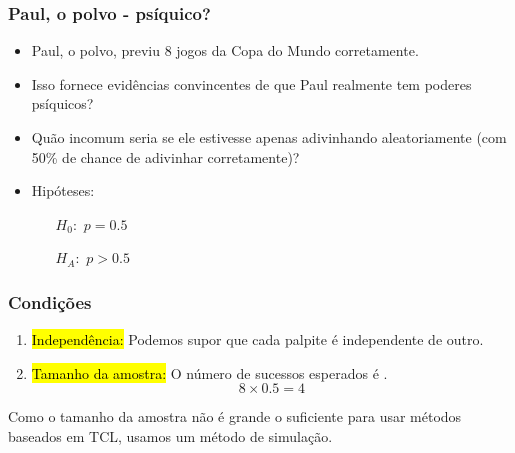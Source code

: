 
\begin{frame}
\frametitle{Paul, o polvo - psíquico?}

\begin{itemize}
\justifying
\item Paul, o polvo, previu 8 jogos da Copa do Mundo corretamente.

\pause
\justifying
\item Isso fornece evidências convincentes de que Paul realmente tem poderes psíquicos?

\pause
\justifying
\item Quão incomum seria se ele estivesse apenas adivinhando aleatoriamente (com 50\% de chance de
adivinhar corretamente)?

\pause
\justifying
\item Hipóteses:
\begin{itemize}
\item[$H_0:$] $p = 0.5$
\item[$H_A:$] $p > 0.5$
\end{itemize}

\end{itemize}

\end{frame}


\begin{frame}
\frametitle{Condições}

\begin{enumerate}
\justifying
\item \hl{Independência:} Podemos supor que cada palpite é independente de outro.

\pause
\justifying
\item \hl{Tamanho da amostra:} O número de sucessos esperados é .
\[ 8 \times 0.5 = 4 \]

\end{enumerate}

\pause

\vspace{1cm}
\justifying
{}

\pause
\justifying
Como o tamanho da amostra não é grande o suficiente para usar métodos baseados em TCL, usamos um método de simulação.

\end{frame}


